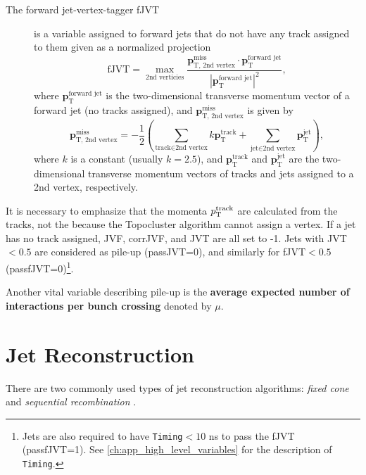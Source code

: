 \begin{description}
    \item[The forward jet-vertex-tagger fJVT] \cite{fjvt} is a variable assigned to forward jets that do not have any track assigned to them given as a normalized projection 
    \begin{equation}
        \label{eq:fjvt}
        \text{fJVT} = \max_{\text{2nd verticies}}{\frac{\textbf{p}^{\text{miss}}_{\text{T, 2nd vertex}} \cdot \textbf{p}_{\text{T}}^{\text{forward jet}}}{|\textbf{p}_{\text{T}}^{\text{forward jet}}|^2}},
    \end{equation}
    where $\textbf{p}_{\text{T}}^{\text{forward jet}}$ is the two-dimensional transverse momentum vector of a forward jet (no tracks assigned), and $\textbf{p}_{\text{T, 2nd vertex}}^{\text{miss}}$ is given by
    \begin{equation}
        \textbf{p}_{\text{T, 2nd vertex}}^{\text{miss}} = -\frac12\left(\sum_{\text{track} \in \text{2nd vertex}} k\textbf{p}_{\text{T}}^{\text{track}} 
        + \sum_{\text{jet} \in \text{2nd vertex} }\textbf{p}_{\text{T}}^{\text{jet}}\right),
    \end{equation}
    where $k$ is a constant (usually $k=2.5$), and $\textbf{p}_{\text{T}}^{\text{track}}$ and $\textbf{p}_{\text{T}}^{\text{jet}}$ are the two-dimensional transverse momentum vectors of tracks and jets assigned to a 2nd vertex, respectively.
\end{description}

It is necessary to emphasize that the momenta $p_\text{T}^{\text{track}}$ are calculated from the tracks, not the \PFOs because the Topocluster algorithm cannot assign a vertex.
If a jet has no track assigned, JVF, corrJVF, and JVT are all set to -1.
Jets with JVT$< 0.5$ are considered as pile-up (passJVT=0), and similarly for fJVT$<0.5$ (passfJVT=0)\footnote{Jets are also required to have \texttt{Timing}$<10$ ns to pass the fJVT (passfJVT=1). See \cref{ch:app_high_level_variables} for the description of \texttt{Timing}.}.

Another vital variable describing pile-up is the \textbf{average expected number of interactions per bunch crossing} denoted by $\mu$.

\section{Jet Reconstruction}
\label{sec:jet_reco}
There are two commonly used types of jet reconstruction algorithms: \emph{fixed cone} and \emph{sequential recombination} \cite{jet_reco_rev}.

